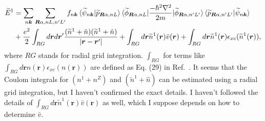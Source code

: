 \documentclass{article}
\begin{document}
\begin{align} 
  \widetilde{E}^1 &= 
  \sum_{n\bm{k}} \sum_{\bm{R}\alpha, nL, n'L'}f_{n\bm{k}} 
  \braket{\widetilde{\psi}_{n\bm{k}} | \widetilde{p}_{\bm{R}\alpha, nL}}
  \braket{\widetilde{\phi}_{\bm{R}\alpha, nL}| \frac{-\hbar^2\nabla^2}{2m} |\widetilde{\phi}_{\bm{R}\alpha, n'L'}}
  \braket{\widetilde{p}_{\bm{R}\alpha, n'L'}|\widetilde{\psi}_{n\bm{k}} }
  \nonumber\\&
  + \frac{e^2}{2}\int_{RG} d\bm{r}d\bm{r}' \frac{(\widetilde{n}^1 + \hat{n})(\widetilde{n}^1 + \hat{n})}{|\bm{r}-\bm{r}'|}
  + \int_{RG} d\bm{r} \widetilde{n}^1(\bm{r})\bar{v}(\bm{r})
  + \int_{RG} d\bm{r} \widetilde{n}^1(\bm{r})\epsilon_{xc}(\widetilde{n}^1(\bm{r})),
  \label{eq:tildeE1_numerical_calculation}
\end{align}
where $RG$ stands for radial grid integration. $\int_{RG}$ for terms like $\int_{RG} d\bm{r} n(\bm{r})\epsilon_{xc}(n(\bm{r}))$ are defined as Eq. (29) in Ref.~\cite{PhysRevB.50.17953}. 
It seems that the Coulom integrals for $({n}^1 + n^Z)$ and $(\widetilde{n}^1 + \hat{n})$ can be estimated using a radial grid integration, but I haven't confirmed the exact details.  
I haven't followed the details of $\int_{RG} d\bm{r} \widetilde{n}^1(\bm{r})\bar{v}(\bm{r})$ as well, which I suppose depends on how to determine $\bar{v}$.
\end{document}
